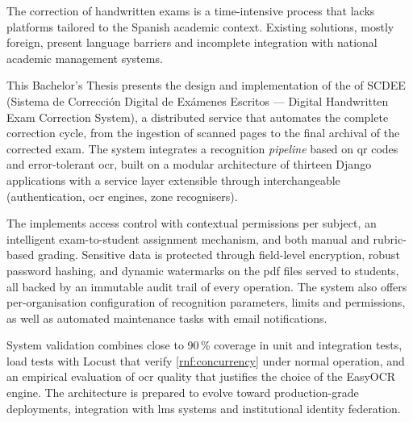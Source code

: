 The correction of handwritten exams is a time-intensive process that
lacks platforms tailored to the Spanish academic context. Existing
solutions, mostly foreign, present language barriers and incomplete
integration with national academic management systems.

This Bachelor's Thesis presents the design and implementation of the
 of SCDEE (Sistema de Corrección Digital de Exámenes
Escritos — Digital Handwritten Exam Correction System), a distributed
 service that automates the complete correction cycle,
from the ingestion of scanned pages to the final archival of the
corrected exam. The system integrates a recognition \textit{pipeline}
based on \acs{qr} codes and error-tolerant \acs{ocr}, built on a modular
architecture of thirteen Django applications with a service layer
extensible through interchangeable  (authentication,
\acs{ocr} engines, zone recognisers).

The  implements  access control with
contextual permissions per subject, an intelligent exam-to-student
assignment mechanism, and both manual and rubric-based grading. Sensitive
data is protected through field-level encryption, robust password
hashing, and dynamic watermarks on the \acs{pdf} files served to
students, all backed by an immutable audit trail of every operation. The
system also offers per-organisation configuration of recognition
parameters, limits and permissions, as well as automated maintenance
tasks with email notifications.

System validation combines close to 90\,\% coverage in unit and
integration tests, load tests with Locust that verify
\cref{rnf:concurrency} under normal operation, and an empirical
evaluation of \acs{ocr} quality that justifies the choice of the EasyOCR
engine. The architecture is prepared to evolve toward production-grade
deployments, integration with \acs{lms} systems and institutional
identity federation.

